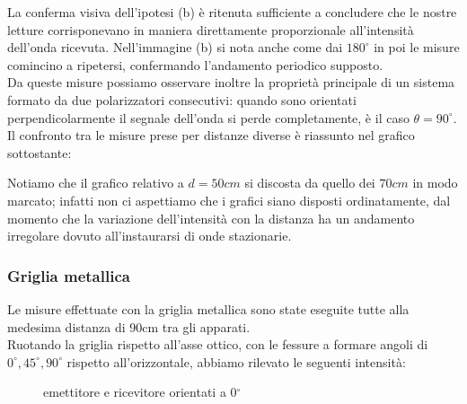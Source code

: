 \documentclass{article}
\theoremstyle{definition}
\begin{document}
\noindent La conferma visiva dell'ipotesi (b) è ritenuta sufficiente a concludere che le nostre letture corrisponevano in maniera direttamente proporzionale all'intensità dell'onda ricevuta. Nell'immagine (b) si nota anche come dai \(180^{\circ}\) in poi le misure comincino a ripetersi, confermando l'andamento periodico supposto.\\
\noindent Da queste misure possiamo osservare inoltre la proprietà principale di un sistema formato da due polarizzatori consecutivi: quando sono orientati perpendicolarmente il segnale dell'onda si perde completamente, è il caso \(\theta = 90^{\circ}\).\\

\noindent Il confronto tra le misure prese per distanze diverse è riassunto nel grafico sottostante:

\begin{figure}[!ht]
    	\captionsetup{labelformat=empty}

\end{figure}

\noindent Notiamo che il grafico relativo a \(d = 50cm\) si discosta da quello dei \(70cm\) in modo marcato; infatti non ci aspettiamo che i grafici siano disposti ordinatamente, dal momento che la variazione dell'intensità con la distanza ha un andamento irregolare dovuto all'instaurarsi di onde stazionarie.\\


\subsubsection{Griglia metallica}
Le misure effettuate con la griglia metallica sono state eseguite tutte alla medesima distanza di 90cm tra gli apparati.\\
\noindent Ruotando la griglia rispetto all'asse ottico, con le fessure a formare angoli di \(0^{\circ}, 45^{\circ}, 90^{\circ}\) rispetto all'orizzontale, abbiamo rilevato le seguenti intensità:

 \begin{figure}[!htbp]
    	\captionsetup{labelformat=empty}
        \caption{emettitore e ricevitore orientati a 0\(^{\circ}\)}
    	
\end{figure}
\end{document}
